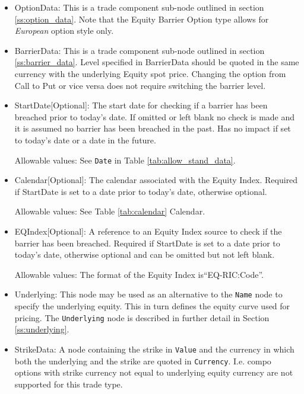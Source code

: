 \begin{itemize}
\item OptionData: This is a trade component sub-node outlined in section \ref{ss:option_data}. Note that the Equity Barrier Option type allows for \emph{European} option style only. 

\item BarrierData: This is a trade component sub-node outlined in section \ref{ss:barrier_data}.
Level specified in BarrierData should be quoted in the same currency with the underlying Equity spot price.
Changing the option from Call to Put or vice versa does not require switching the barrier level.

\item StartDate[Optional]: The start date for checking if a barrier has been breached prior to today's date. If omitted or left blank no check is made and it is assumed no barrier has been breached in the past. Has no impact if set to today's date or a date in the future.

Allowable values:  See \lstinline!Date! in Table \ref{tab:allow_stand_data}.

\item Calendar[Optional]: The calendar associated with the Equity Index. Required if StartDate is set to a date prior to today's date, otherwise optional.

Allowable values: See Table \ref{tab:calendar} Calendar.

\item EQIndex[Optional]: A reference to an Equity Index source to check if the barrier has been breached. Required if StartDate is set to a date prior to today's date, otherwise optional and can be omitted but not left blank.

Allowable values:  The format of the Equity Index is``EQ-RIC:Code''. 

\item Underlying:  This node may be used as an alternative to the \lstinline!Name! node to specify the underlying equity. This in turn defines the equity curve used for pricing. The \lstinline!Underlying! node is described in further detail in Section \ref{ss:underlying}.

\item StrikeData: A node containing the strike in \lstinline!Value! and the currency in which both the underlying and the strike are quoted in \lstinline!Currency!. I.e. compo options with strike currency not equal to underlying equity currency are not supported for this trade type.


\end{itemize}

